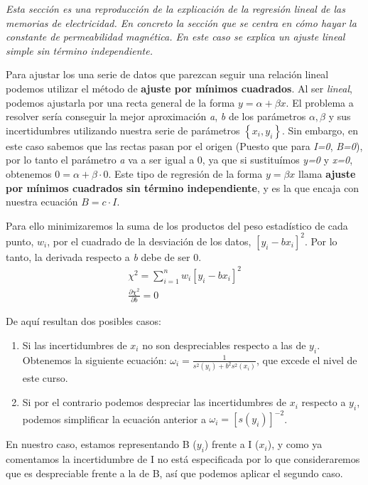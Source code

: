 \documentclass[12pt, a4paper, titlepage]{article}
\begin{document}
  \textit{Esta sección es una reproducción de la explicación de la regresión lineal de las memorias de electricidad. En concreto la sección que se centra en cómo hayar la constante de permeabilidad magnética. En este caso se explica un ajuste lineal simple sin término independiente.}

  Para ajustar los una serie de datos que parezcan seguir una relación lineal podemos utilizar el método de \textbf{ajuste por mínimos cuadrados}. Al ser \textit{lineal}, podemos ajustarla por una recta general de la forma $y = \alpha + \beta x$. El problema a resolver sería conseguir la mejor aproximación \textit{a}, \textit{b} de los parámetros $\alpha, \beta$ y sus incertidumbres utilizando nuestra serie de parámetros $\left\{ x_i, y_i \right\}$. Sin embargo, en este caso sabemos que las rectas pasan por el origen (Puesto que para \textit{I=0}, \textit{B=0}), por lo tanto el parámetro \textit{a} va a ser igual a 0, ya que si sustituímos \textit{y=0} y \textit{x=0}, obtenemos $0 = \alpha + \beta \cdot 0$. Este tipo de regresión de la forma $y = \beta x$ llama \textbf{ajuste por mínimos cuadrados sin término independiente}, y es la que encaja con nuestra ecuación $B = c \cdot I$.

  Para ello minimizaremos la suma de los productos del peso estadístico de cada punto, $w_i$, por el cuadrado de la desviación de los datos, $[y_i - bx_i]^2$. Por lo tanto, la derivada respecto a \textit{b} debe de ser 0.
  \begin{gather}
    \chi^2 = \sum^{n}_{i=1} w_i[y_i - bx_i]^2 \label{ec:chi2} \\
    \frac{\partial \chi^2}{\partial b}=0 \label{ec:deriv}
  \end{gather}

  De aquí resultan dos posibles casos:

  \begin{enumerate}
    \item Si las incertidumbres de $x_i$ no son despreciables respecto a las de $y_i$. Obtenemos la siguiente ecuación: $\omega_i=\frac{1}{s^2(y_i)+b^2s^2(x_i)}$, que excede el nivel de este curso.
    \item Si por el contrario podemos despreciar las incertidumbres de $x_i$ respecto a $y_i$, podemos simplificar la ecuación anterior a $\omega_i=[s(y_i)]^{-2}$.
  \end{enumerate}

  En nuestro caso, estamos representando B ($y_i$) frente a I ($x_i$), y como ya comentamos la incertidumbre de I no está especificada por lo que consideraremos que es despreciable frente a la de B, así que podemos aplicar el segundo caso.
\end{document}
